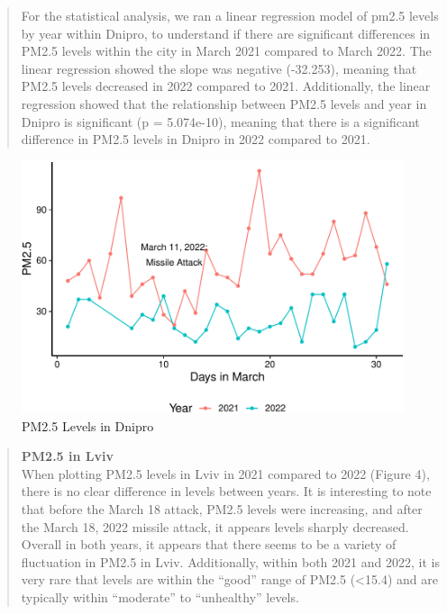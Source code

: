 \documentclass[
  12pt,
]{article}
\begin{document}
\begin{quote}
For the statistical analysis, we ran a linear regression model of pm2.5
levels by year within Dnipro, to understand if there are significant
differences in PM2.5 levels within the city in March 2021 compared to
March 2022. The linear regression showed the slope was negative
(-32.253), meaning that PM2.5 levels decreased in 2022 compared to 2021.
Additionally, the linear regression showed that the relationship between
PM2.5 levels and year in Dnipro is significant (p = 5.074e-10), meaning
that there is a significant difference in PM2.5 levels in Dnipro in 2022
compared to 2021.
\end{quote}

\begin{figure}
\centering
\includegraphics{Fontanie_Gordon_Weinberg_Project_files/figure-latex/Visualizing PM25 in Dnipro-1.pdf}
\caption{PM2.5 Levels in Dnipro}
\end{figure}

\newpage

\begin{quote}
\textbf{PM2.5 in Lviv}\\
When plotting PM2.5 levels in Lviv in 2021 compared to 2022 (Figure 4),
there is no clear difference in levels between years. It is interesting
to note that before the March 18 attack, PM2.5 levels were increasing,
and after the March 18, 2022 missile attack, it appears levels sharply
decreased. Overall in both years, it appears that there seems to be a
variety of fluctuation in PM2.5 in Lviv. Additionally, within both 2021
and 2022, it is very rare that levels are within the ``good'' range of
PM2.5 (\textless15.4) and are typically within ``moderate'' to
``unhealthy'' levels.
\end{quote}
\end{document}
